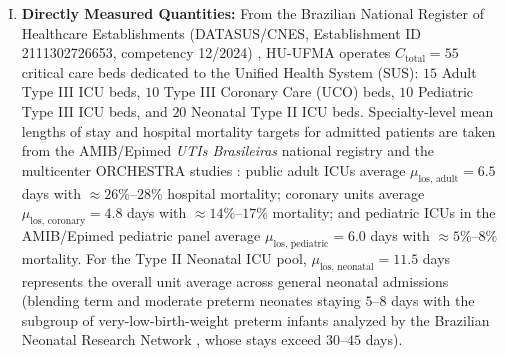\documentclass[final,5p,times,twocolumn]{elsarticle}
\begin{document}
\begin{enumerate}[(I)]
    \item \textbf{Directly Measured Quantities:} From the Brazilian National Register of Healthcare Establishments (DATASUS/CNES, Establishment ID 2111302726653, competency 12/2024) \cite{cnes_datasus_huufma}, HU-UFMA operates $C_{\text{total}} = 55$ critical care beds dedicated to the Unified Health System (SUS): $15$ Adult Type III ICU beds, $10$ Type III Coronary Care (UCO) beds, $10$ Pediatric Type III ICU beds, and $20$ Neonatal Type II ICU beds. Specialty-level mean lengths of stay and hospital mortality targets for admitted patients are taken from the AMIB/Epimed \textit{UTIs Brasileiras} national registry \cite{utisbrasileiras2024} and the multicenter ORCHESTRA studies \cite{soares2024orchestra, soares2024update, zampieri2019icu}: public adult ICUs average $\mu_{\text{los, adult}} = 6.5$ days with $\approx 26\%$--$28\%$ hospital mortality; coronary units average $\mu_{\text{los, coronary}} = 4.8$ days with $\approx 14\%$--$17\%$ mortality; and pediatric ICUs in the AMIB/Epimed pediatric panel \cite{utisbrasileiras2024} average $\mu_{\text{los, pediatric}} = 6.0$ days with $\approx 5\%$--$8\%$ mortality. For the Type II Neonatal ICU pool, $\mu_{\text{los, neonatal}} = 11.5$ days represents the overall unit average across general neonatal admissions (blending term and moderate preterm neonates staying $5$--$8$ days with the subgroup of very-low-birth-weight preterm infants analyzed by the Brazilian Neonatal Research Network \cite{guinsburg2016death}, whose stays exceed $30$--$45$ days).

\end{enumerate}
\end{document}
